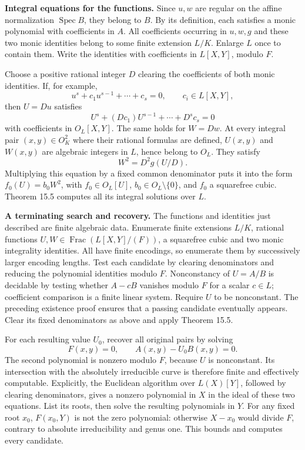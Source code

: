 \documentclass[
  11pt,
  a4paper,
]{article}
\begin{document}
\textbf{Integral equations for the functions.} Since \(u,w\) are regular
on the affine normalization \(\operatorname{Spec}B\), they belong to
\(B\). By its definition, each satisfies a monic polynomial with
coefficients in \(A\). All coefficients occurring in \(u,w,g\) and these
two monic identities belong to some finite extension \(L/K\). Enlarge
\(L\) once to contain them. Write the identities with coefficients in
\(L[X,Y]\), modulo \(F\).

Choose a positive rational integer \(D\) clearing the coefficients of
both monic identities. If, for example, \[
u^s+c_1u^{s-1}+\cdots+c_s=0,\qquad c_i\in L[X,Y],
\] then \(U=Du\) satisfies \[
U^s+(Dc_1)U^{s-1}+\cdots+D^sc_s=0
\] with coefficients in \(O_L[X,Y]\). The same holds for \(W=Dw\). At
every integral pair \((x,y)\in O_K^2\) where their rational formulas are
defined, \(U(x,y)\) and \(W(x,y)\) are algebraic integers in \(L\),
hence belong to \(O_L\). They satisfy \[
W^2=D^2g(U/D).
\] Multiplying this equation by a fixed common denominator puts it into
the form \(f_0(U)=b_0W^2\), with \(f_0\in O_L[U]\),
\(b_0\in O_L\setminus\{0\}\), and \(f_0\) a squarefree cubic. Theorem
15.5 computes all its integral solutions over \(L\).

\textbf{A terminating search and recovery.} The functions and identities
just described are finite algebraic data. Enumerate finite extensions
\(L/K\), rational functions \(U,W\in\operatorname{Frac}(L[X,Y]/(F))\), a
squarefree cubic and two monic integrality identities. All have finite
encodings, so enumerate them by successively larger encoding lengths.
Test each candidate by clearing denominators and reducing the polynomial
identities modulo \(F\). Nonconstancy of \(U=A/B\) is decidable by
testing whether \(A-cB\) vanishes modulo \(F\) for a scalar \(c\in L\);
coefficient comparison is a finite linear system. Require \(U\) to be
nonconstant. The preceding existence proof ensures that a passing
candidate eventually appears. Clear its fixed denominators as above and
apply Theorem 15.5.

For each resulting value \(U_0\), recover all original pairs by solving
\[
F(x,y)=0,\qquad A(x,y)-U_0B(x,y)=0.
\] The second polynomial is nonzero modulo \(F\), because \(U\) is
nonconstant. Its intersection with the absolutely irreducible curve is
therefore finite and effectively computable. Explicitly, the Euclidean
algorithm over \(L(X)[Y]\), followed by clearing denominators, gives a
nonzero polynomial in \(X\) in the ideal of these two equations. List
its roots, then solve the resulting polynomials in \(Y\). For any fixed
root \(x_0\), \(F(x_0,Y)\) is not the zero polynomial: otherwise
\(X-x_0\) would divide \(F\), contrary to absolute irreducibility and
genus one. This bounds and computes every candidate.
\end{document}
